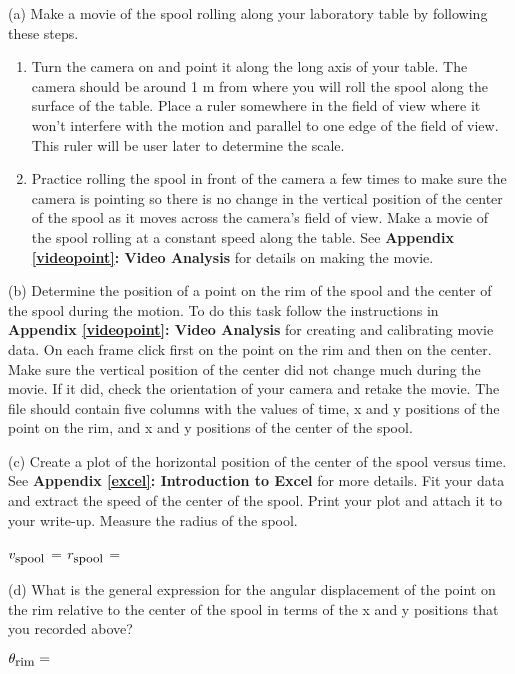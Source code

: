 (a) Make a movie of the spool rolling along your laboratory table by following
these steps. 

\begin{enumerate}
\item Turn the camera on and point it along the long axis of your table. The camera
should be around 1 m from where you will roll the spool along the surface of
the table. Place a ruler somewhere in the field of view where it won't interfere
with the motion and parallel to one edge of the field of view. This ruler will
be user later to determine the scale. 
\item Practice rolling the spool in front of the camera a few times to make sure the
camera is pointing so there is no change in the vertical position of the center
of the spool as it moves across the camera's field of view. Make a movie of
the spool rolling at a constant speed along the table. See \textbf{Appendix
\ref{videopoint}: Video Analysis} for details on making the movie.
\end{enumerate}
(b) Determine the position of a point on the rim of the spool and the center
of the spool during the motion. To do this task follow the instructions in \textbf{Appendix
\ref{videopoint}: Video Analysis} for creating and calibrating movie data. On each frame click
first on the point on the rim and then on the center. Make sure the vertical
position of the center did not change much during the movie. If it did, check
the orientation of your camera and retake the movie. The file should contain
five columns with the values of time, x and y positions of the point on the
rim, and x and y positions of the center of the spool.

(c) Create a plot of the horizontal position of the center of the spool versus
time. See \textbf{Appendix \ref{excel}: Introduction to Excel} for more details.
Fit your data and extract the speed of the center of the spool. Print your plot
and attach it to your write-up. Measure the radius of the spool.
\vspace{5mm}

\( v_{\mbox{\small spool}} \) = \hfill{}\( r_{\mbox{\small spool}} \) = \hfill{}
\vspace{5mm}

(d) What is the general expression for the angular displacement of the point
on the rim relative to the center of the spool in terms of the x and y positions
that you recorded above? 
\vspace{5mm}

\( \theta _{\mbox{\small rim}}= \) 
\vspace{5mm}

